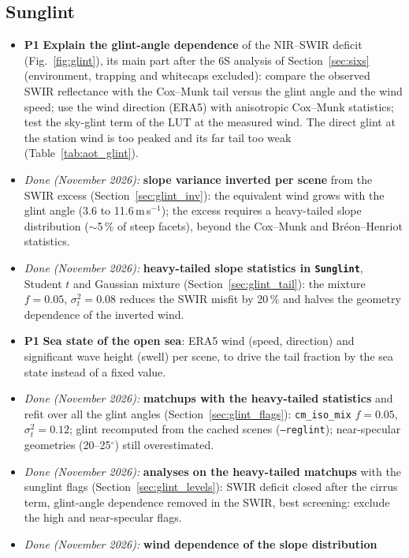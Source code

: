 \documentclass[11pt,a4paper]{article}
\newcommand{\code}[1]{\texttt{#1}}
\newcommand{\prio}[1]{\textbf{\textcolor{blue!50!black}{#1}}}
\begin{document}
\subsection{Sunglint}
\label{sec:roadmap_glint}
\begin{itemize}
\item \prio{P1} \textbf{Explain the glint-angle dependence} of the NIR--SWIR deficit (Fig.~\ref{fig:glint}), its main
  part after the 6S analysis of Section~\ref{sec:sixs} (environment, trapping and whitecaps excluded): compare
  the observed SWIR reflectance with the Cox--Munk tail versus the glint angle and the wind speed; use the
  wind direction (ERA5) with anisotropic Cox--Munk statistics; test the sky-glint term of the LUT at the measured
  wind. The direct glint at the station wind is too peaked and its far tail too weak
  (Table~\ref{tab:aot_glint}).
\item \textit{Done (November 2026):} \textbf{slope variance inverted per scene} from the SWIR excess
  (Section~\ref{sec:glint_inv}): the equivalent wind grows with the glint angle (3.6 to 11.6\,m\,s$^{-1}$); the
  excess requires a heavy-tailed slope distribution ($\sim$5\,\% of steep facets), beyond the Cox--Munk and
  Bréon--Henriot statistics.
\item \textit{Done (November 2026):} \textbf{heavy-tailed slope statistics in \code{Sunglint}}, Student $t$
  and Gaussian mixture (Section~\ref{sec:glint_tail}): the mixture $f = 0.05$, $\sigma_t^2 = 0.08$ reduces the SWIR misfit by 20\,\% and halves the geometry dependence of the inverted wind.
\item \prio{P1} \textbf{Sea state of the open sea}: ERA5 wind (speed, direction) and significant wave height (swell)
  per scene, to drive the tail fraction by the sea state instead of a fixed value.
\item \textit{Done (November 2026):} \textbf{matchups with the heavy-tailed statistics} and refit over all the
  glint angles (Section~\ref{sec:glint_flags}): \code{cm\_iso\_mix} $f=0.05$, $\sigma_t^2=0.12$; glint recomputed
  from the cached scenes (\code{--reglint}); near-specular geometries (20--25$^\circ$) still overestimated.
\item \textit{Done (November 2026):} \textbf{analyses on the heavy-tailed matchups} with the sunglint flags
  (Section~\ref{sec:glint_levels}): SWIR deficit closed after the cirrus term, glint-angle dependence removed in the
  SWIR, best screening: exclude the high and near-specular flags.
\item \textit{Done (November 2026):} \textbf{wind dependence of the slope distribution}

\end{itemize}
\end{document}
